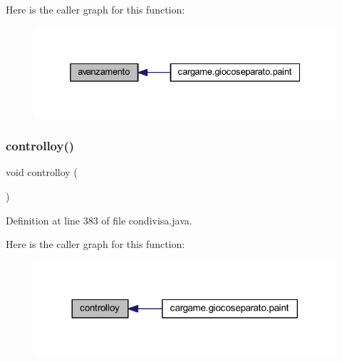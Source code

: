 Here is the caller graph for this function\+:
\nopagebreak
\begin{figure}[H]
\begin{center}
\leavevmode
\includegraphics[width=332pt]{classcargame_1_1condivisa_a93b971884ca2e884143dbb35744cb6f0_icgraph}
\end{center}
\end{figure}
\mbox{\label{classcargame_1_1condivisa_ae9e74ddcbb1dc6bf32f46cb712222303}} 
\subsubsection{\texorpdfstring{controlloy()}{controlloy()}}
{\footnotesize\ttfamily void controlloy (\begin{DoxyParamCaption}{ }\end{DoxyParamCaption})}



Definition at line 383 of file condivisa.\+java.

Here is the caller graph for this function\+:
\nopagebreak
\begin{figure}[H]
\begin{center}
\leavevmode
\includegraphics[width=317pt]{classcargame_1_1condivisa_ae9e74ddcbb1dc6bf32f46cb712222303_icgraph}
\end{center}
\end{figure}
\mbox{\label{classcargame_1_1condivisa_ad92dcd19309e0721961bc42f9ed605ed}} 
